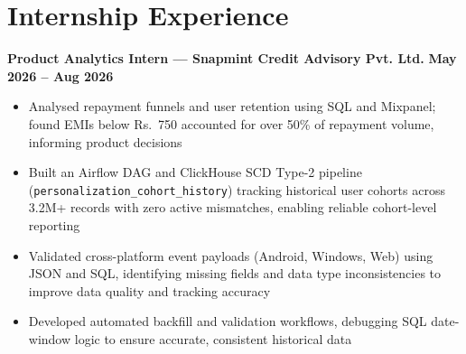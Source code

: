 \documentclass[11pt,a4paper]{article}
\begin{document}
\section{Internship Experience}
\vspace{1pt}
\textbf{Product Analytics Intern — Snapmint Credit Advisory Pvt. Ltd.}
\hfill \textbf{May 2026 -- Aug 2026}
\begin{itemize}
\item Analysed repayment funnels and user retention using SQL and Mixpanel; found EMIs below Rs.~750 accounted for over 50\% of repayment volume, informing product decisions
\item Built an Airflow DAG and ClickHouse SCD Type-2 pipeline (\texttt{personalization\_cohort\_history}) tracking historical user cohorts across 3.2M+ records with zero active mismatches, enabling reliable cohort-level reporting
\item Validated cross-platform event payloads (Android, Windows, Web) using JSON and SQL, identifying missing fields and data type inconsistencies to improve data quality and tracking accuracy
\item Developed automated backfill and validation workflows, debugging SQL date-window logic to ensure accurate, consistent historical data
\end{itemize}
\end{document}
